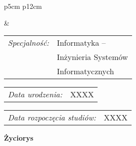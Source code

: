 
\begin{titlepage}


    \newpage\thispagestyle{empty}
    \begin{tabular}{p{5cm} p{12cm}}
    \begin{minipage}{5cm}
    \center
    \end{minipage}
    &
    \begin{minipage}{12cm}
    \begin{flushleft}
    \par\noindent\vspace{0\baselineskip}
    \begin{tabular}[h]{l l}
    {\normalsize\it Specjalność:} & Informatyka -- \\
    & Inżynieria Systemów \\
    & Informatycznych
    \end{tabular}
    \par\noindent\vspace{1\baselineskip}
    \begin{tabular}[h]{l l}
    {\normalsize\it Data urodzenia:} & {\normalsize XXXX}
    \end{tabular}
    \par\noindent\vspace{1\baselineskip}
    \begin{tabular}[h]{l l}
    {\normalsize\it Data rozpoczęcia studiów:} & {\normalsize XXXX}%
    \end{tabular}
    \par\noindent\vspace{1\baselineskip}
    \end{flushleft}
    \end{minipage}
    \end{tabular}
    \vspace*{0\baselineskip}
    \begin{center}
	{\large\bfseries Życiorys}\par\bigskip
    \end{center}

    \indent


\end{titlepage}
